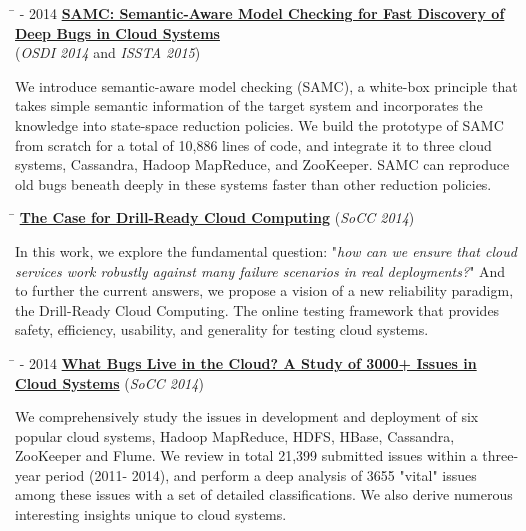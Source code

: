 \documentclass[10pt]{article} %
\begin{document}
\begin{tabbing}
\hspace{2.5cm} \=  - 2014 \> \href{http://ucare.cs.uchicago.edu/pdf/osdi14-samc.pdf}{\textbf{SAMC: Semantic-Aware Model Checking for Fast Discovery of Deep Bugs in Cloud Systems}} \\
\>\+ (\textit{OSDI 2014} and \textit{ISSTA 2015}) \\
\begin{minipage}{\smallertextwidth}
We introduce semantic-aware model checking (SAMC), a white-box principle that
takes simple semantic information of the target system and incorporates the
knowledge into state-space reduction policies. We build the prototype of SAMC
from scratch for a total of 10,886 lines of code, and 
integrate it to three cloud systems, Cassandra, Hadoop MapReduce, and ZooKeeper.
SAMC can reproduce old bugs beneath deeply in these systems faster than other
reduction policies.
\end{minipage}
\end{tabbing}

\begin{tabbing}
\hspace{2.5cm} \=  \>\+ \href{http://ucare.cs.uchicago.edu/pdf/socc14-drill.pdf}{\textbf{The Case for Drill-Ready Cloud Computing}} (\textit{SoCC 2014}) \\
\begin{minipage}{\smallertextwidth}
In this work, we explore the fundamental question: "\textit{how can we ensure
that cloud services work robustly against many failure scenarios in real
deployments?}" And to further the current answers, we propose a vision of a new
reliability paradigm, the Drill-Ready Cloud Computing. The online testing
framework that provides safety, efficiency, usability, and generality for
testing cloud systems.
\end{minipage}
\end{tabbing}

\begin{tabbing}
\hspace{2.5cm} \=  - 2014 \>\+ \href{http://ucare.cs.uchicago.edu/pdf/socc14-cbs.pdf}{\textbf{What Bugs Live in the Cloud? A Study of 3000+ Issues in Cloud Systems}} (\textit{SoCC 2014}) \\
\begin{minipage}{\smallertextwidth}
We comprehensively study the issues in development and deployment of six popular cloud
systems, Hadoop MapReduce, HDFS, HBase, Cassandra, ZooKeeper and Flume. We
review in total 21,399 submitted issues within a three-year period (2011- 2014),
and perform a deep analysis of 3655 "vital" issues among these issues with a
set of detailed classifications. We also derive numerous interesting insights
unique to cloud systems. 
\end{minipage}
\end{tabbing}
\end{document}
